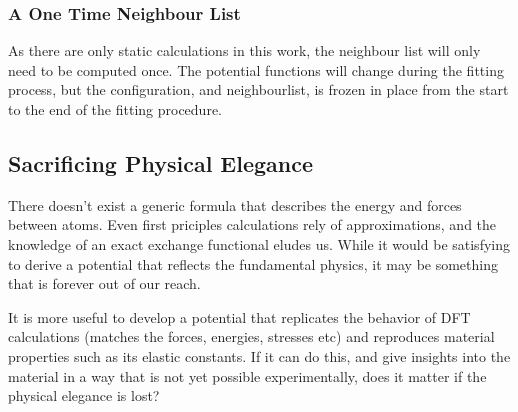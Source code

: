 \subsubsection{A One Time Neighbour List}

As there are only static calculations in this work, the neighbour list will only need to be computed once.  The potential functions will change during the fitting process, but the configuration, and neighbourlist, is frozen in place from the start to the end of the fitting procedure.





\subsection{Sacrificing Physical Elegance}

There doesn't exist a generic formula that describes the energy and forces between atoms.  Even first priciples calculations rely of approximations, and the knowledge of an exact exchange functional eludes us.  While it would be satisfying to derive a potential that reflects the fundamental physics, it may be something that is forever out of our reach.

It is more useful to develop a potential that replicates the behavior of DFT calculations (matches the forces, energies, stresses etc) and reproduces material properties such as its elastic constants.  If it can do this, and give insights into the material in a way that is not yet possible experimentally, does it matter if the physical elegance is lost?








